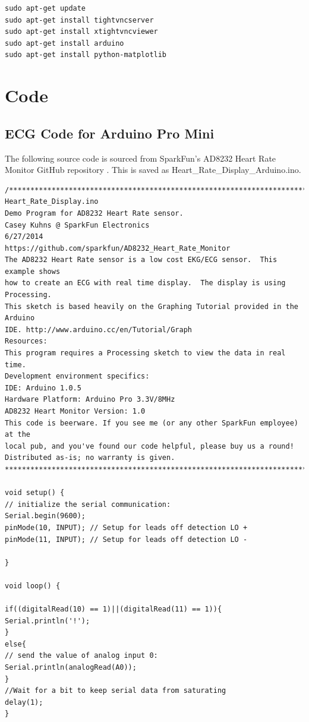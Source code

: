 \begin{lstlisting}
sudo apt-get update
sudo apt-get install tightvncserver
sudo apt-get install xtightvncviewer
sudo apt-get install arduino
sudo apt-get install python-matplotlib
\end{lstlisting}





\section{Code}

\subsection{ECG Code for Arduino Pro Mini}
\label{ecgarduino}

The following source code is sourced from SparkFun's AD8232 Heart Rate Monitor GitHub repository \cite{ad8232github}. This is saved as Heart\_Rate\_Display\_Arduino.ino.

\begin{lstlisting}
/******************************************************************************
Heart_Rate_Display.ino
Demo Program for AD8232 Heart Rate sensor.
Casey Kuhns @ SparkFun Electronics
6/27/2014
https://github.com/sparkfun/AD8232_Heart_Rate_Monitor
The AD8232 Heart Rate sensor is a low cost EKG/ECG sensor.  This example shows
how to create an ECG with real time display.  The display is using Processing.
This sketch is based heavily on the Graphing Tutorial provided in the Arduino
IDE. http://www.arduino.cc/en/Tutorial/Graph
Resources:
This program requires a Processing sketch to view the data in real time.
Development environment specifics:
IDE: Arduino 1.0.5
Hardware Platform: Arduino Pro 3.3V/8MHz
AD8232 Heart Monitor Version: 1.0
This code is beerware. If you see me (or any other SparkFun employee) at the
local pub, and you've found our code helpful, please buy us a round!
Distributed as-is; no warranty is given.
******************************************************************************/

void setup() {
// initialize the serial communication:
Serial.begin(9600);
pinMode(10, INPUT); // Setup for leads off detection LO +
pinMode(11, INPUT); // Setup for leads off detection LO -

}

void loop() {

if((digitalRead(10) == 1)||(digitalRead(11) == 1)){
Serial.println('!');
}
else{
// send the value of analog input 0:
Serial.println(analogRead(A0));
}
//Wait for a bit to keep serial data from saturating
delay(1);
}
\end{lstlisting}

